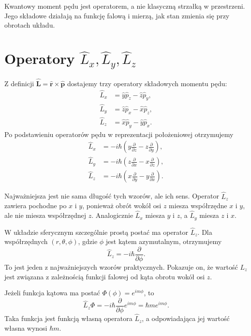 \begin{summarybox}
Kwantowy moment pędu jest operatorem, a nie klasyczną strzałką w przestrzeni. Jego składowe działają na funkcję falową i mierzą, jak stan zmienia się przy obrotach układu.
\end{summarybox}

\section{Operatory \texorpdfstring{\(\hat{L}_x,\hat{L}_y,\hat{L}_z\)}{Lx, Ly, Lz}}

Z definicji \(\hat{\mathbf{L}}=\hat{\mathbf{r}}\times\hat{\mathbf{p}}\) dostajemy trzy operatory składowych momentu pędu:
\begin{align}
    \hat{L}_x &= \hat{y}\hat{p}_z-\hat{z}\hat{p}_y, \\
    \hat{L}_y &= \hat{z}\hat{p}_x-\hat{x}\hat{p}_z, \\
    \hat{L}_z &= \hat{x}\hat{p}_y-\hat{y}\hat{p}_x.
\end{align}
Po podstawieniu operatorów pędu w reprezentacji położeniowej otrzymujemy
\begin{align}
    \hat{L}_x
    &= -i\hbar\left(y\frac{\partial}{\partial z}-z\frac{\partial}{\partial y}\right), \\
    \hat{L}_y
    &= -i\hbar\left(z\frac{\partial}{\partial x}-x\frac{\partial}{\partial z}\right), \\
    \hat{L}_z
    &= -i\hbar\left(x\frac{\partial}{\partial y}-y\frac{\partial}{\partial x}\right).
\end{align}

Najważniejsza jest nie sama długość tych wzorów, ale ich sens. Operator \(\hat{L}_z\) zawiera pochodne po \(x\) i \(y\), ponieważ obrót wokół osi \(z\) miesza współrzędne \(x\) i \(y\), ale nie miesza współrzędnej \(z\). Analogicznie \(\hat{L}_x\) miesza \(y\) i \(z\), a \(\hat{L}_y\) miesza \(z\) i \(x\).

W układzie sferycznym szczególnie prostą postać ma operator \(\hat{L}_z\). Dla współrzędnych \((r,\theta,\phi)\), gdzie \(\phi\) jest kątem azymutalnym, otrzymujemy
\begin{equation}
    \hat{L}_z=-i\hbar\frac{\partial}{\partial\phi}.
\end{equation}
To jest jeden z najważniejszych wzorów praktycznych. Pokazuje on, że wartość \(L_z\) jest związana z zależnością funkcji falowej od kąta obrotu wokół osi \(z\).

\begin{examplebox}
Jeżeli funkcja kątowa ma postać \(\Phi(\phi)=e^{im\phi}\), to
\[
    \hat{L}_z\Phi
    =-i\hbar\frac{\partial}{\partial\phi}e^{im\phi}
    =\hbar m e^{im\phi}.
\]
Taka funkcja jest funkcją własną operatora \(\hat{L}_z\), a odpowiadająca jej wartość własna wynosi \(\hbar m\).
\end{examplebox}

